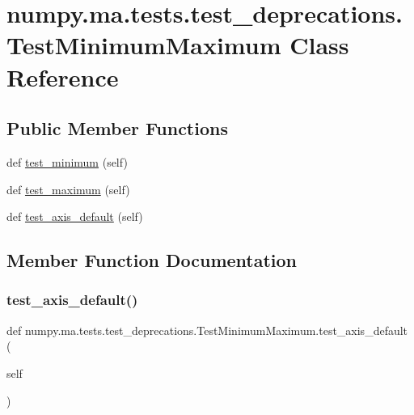\hypertarget{classnumpy_1_1ma_1_1tests_1_1test__deprecations_1_1TestMinimumMaximum}{}\section{numpy.\+ma.\+tests.\+test\+\_\+deprecations.\+Test\+Minimum\+Maximum Class Reference}
\label{classnumpy_1_1ma_1_1tests_1_1test__deprecations_1_1TestMinimumMaximum}
\subsection*{Public Member Functions}
\begin{DoxyCompactItemize}
\item 
def \hyperlink{classnumpy_1_1ma_1_1tests_1_1test__deprecations_1_1TestMinimumMaximum_a8d80795c044f9dc09b973e35b5630647}{test\+\_\+minimum} (self)
\item 
def \hyperlink{classnumpy_1_1ma_1_1tests_1_1test__deprecations_1_1TestMinimumMaximum_a8574aa7a6e04617c3fe4a20f011ece7a}{test\+\_\+maximum} (self)
\item 
def \hyperlink{classnumpy_1_1ma_1_1tests_1_1test__deprecations_1_1TestMinimumMaximum_ad1825a97714c9cf1c0334b8d3180d5a8}{test\+\_\+axis\+\_\+default} (self)
\end{DoxyCompactItemize}


\subsection{Member Function Documentation}
\mbox{\label{classnumpy_1_1ma_1_1tests_1_1test__deprecations_1_1TestMinimumMaximum_ad1825a97714c9cf1c0334b8d3180d5a8}} 
\subsubsection{\texorpdfstring{test\+\_\+axis\+\_\+default()}{test\_axis\_default()}}
{\footnotesize\ttfamily def numpy.\+ma.\+tests.\+test\+\_\+deprecations.\+Test\+Minimum\+Maximum.\+test\+\_\+axis\+\_\+default (\begin{DoxyParamCaption}\item[{}]{self }\end{DoxyParamCaption})}

